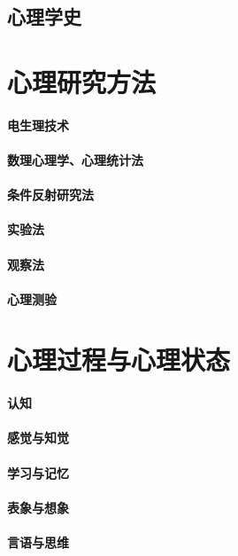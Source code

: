 \documentclass[UTF8]{../RepresentationUniverse}
\begin{document}
\section{心理学史}

\chapter{心理研究方法}
\subsubsection{电生理技术}
\subsubsection{数理心理学、心理统计法}
\subsubsection{条件反射研究法}
\subsubsection{实验法}
\subsubsection{观察法}
\subsubsection{心理测验}

\chapter{心理过程与心理状态}
\subsubsection{认知}
\subsubsection{感觉与知觉}
\subsubsection{学习与记忆}
\subsubsection{表象与想象}
\subsubsection{言语与思维}
\end{document}
